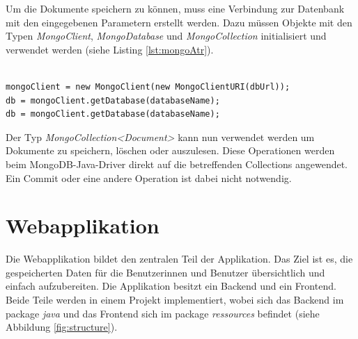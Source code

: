 Um die Dokumente speichern zu können, muss eine Verbindung zur Datenbank mit den eingegebenen Parametern erstellt werden. Dazu müssen Objekte mit den Typen \textit{MongoClient}, \textit{MongoDatabase} und \textit{MongoCollection} initialisiert und verwendet werden (siehe Listing \ref{lst:mongoAtr}).

\lstset{
  caption={Benötigte Attribute, um sich mit der Datenbank verbinden und die Collections verwenden.}, 
  basicstyle=\small\ttfamily, 
  label=lst:mongoAtr, 
  language=Java,
  frame=single,
  breaklines=true, %
  postbreak=\mbox{\textcolor{red}{$\hookrightarrow$}\space},
}

\begin{samepage}%
	\begin{lstlisting}[float=tbhp]
	
mongoClient = new MongoClient(new MongoClientURI(dbUrl));
db = mongoClient.getDatabase(databaseName);
db = mongoClient.getDatabase(databaseName);

	\end{lstlisting}
\end{samepage}

Der Typ \textit{MongoCollection<Document>} kann nun verwendet werden um Dokumente zu speichern, löschen oder auszulesen. Diese Operationen werden beim MongoDB-Java-Driver direkt auf die betreffenden Collections angewendet. Ein Commit oder eine andere Operation ist dabei nicht notwendig.


\section{Webapplikation} 
Die Webapplikation bildet den zentralen Teil der Applikation. Das Ziel ist es, die gespeicherten Daten für die Benutzerinnen und Benutzer übersichtlich und einfach aufzubereiten. Die Applikation besitzt ein Backend und ein Frontend. Beide Teile werden in einem Projekt implementiert, wobei sich das Backend im package \textit{java} und das Frontend sich im package \textit{ressources} befindet (siehe Abbildung \ref{fig:structure}).


